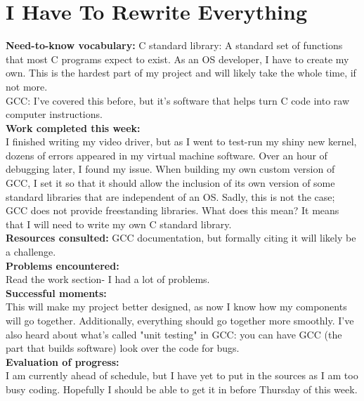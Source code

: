 \documentclass[11pt]{article}
\begin{document}
\section{I Have To Rewrite Everything}
\textbf{Need-to-know vocabulary:}
C standard library: A standard set of functions that most C programs expect to exist. As an OS developer, I have to create my own. This is the hardest part of my project and will likely take the whole time, if not more.\\
GCC: I've covered this before, but it's software that helps turn C code into raw computer instructions. \\
\textbf{Work completed this week:}\\
I finished writing my video driver, but as I went to test-run my shiny new kernel, dozens of errors appeared in my virtual machine software. Over an hour of debugging later, I found my issue. When building my own custom version of GCC, I set it so that it should allow the inclusion of its own version of some standard libraries that are independent of an OS. Sadly, this is not the case; GCC does not provide freestanding libraries. What does this mean? It means that I will need to write my own C standard library.\\
\textbf{Resources consulted:}
GCC documentation, but formally citing it will likely be a challenge.\\
\textbf{Problems encountered:}\\
Read the work section- I had a lot of problems.\\
\textbf{Successful moments:}\\
This will make my project better designed, as now I know how my components will go together. Additionally, everything should go together more smoothly. I've also heard about what's called "unit testing" in GCC: you can have GCC (the part that builds software) look over the code for bugs.\\
\textbf{Evaluation of progress:}\\
I am currently ahead of schedule, but I have yet to put in the sources as I am too busy coding. Hopefully I should be able to get it in before Thursday of this week.
\end{document}

